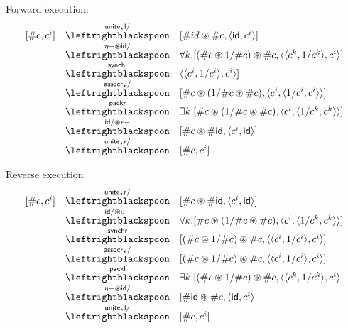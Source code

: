 \documentclass[a4paper,USenglish]{lipics-v2016-utf8x}
\newcommand{\hash}{\#}
\newcommand{\order}[1]{\hash #1}
\newcommand{\iorder}[1]{1/\hash #1}
\newcommand{\synchl}{\mathsf{{synchl}}}
\newcommand{\synchr}{\mathsf{{synchr}}}
\newcommand{\packl}{\mathsf{{packl}}}
\newcommand{\packr}{\mathsf{{packr}}}
\newcommand{\unitetl}{\mathsf{{unite_{\star}l}}}
\newcommand{\unitetr}{\mathsf{{unite_{\star}r}}}
\newcommand{\assocrt}{\mathsf{{assocr_{\star}}}}
\newcommand{\idiso}{\mathsf{{id}}}
\begin{document}
Forward execution:
\[\begin{array}{rcl}
[\order{c},c^i]
&\stackrel{\unitetl/}{\leftrightblackspoon}&
  [\order{id}\circledast\order{c}, \langle \idiso,c^i \rangle] \\
&\stackrel{\eta+\circledast\idiso/}{\leftrightblackspoon}&
  \forall{k}.[(\order{c}\circledast\iorder{c})\circledast\order{c},
  \langle \langle c^k,1/c^k \rangle,c^i \rangle] \\
&\stackrel{\synchl}{\leftrightblackspoon}&
  \langle \langle c^i,1/c^i \rangle,c^i \rangle] \\
&\stackrel{\assocrt/}{\leftrightblackspoon}&
  [\order{c}\circledast(\iorder{c}\circledast\order{c}),
  \langle c^i, \langle 1/c^i,c^i \rangle\rangle] \\
&\stackrel{\packr}{\leftrightblackspoon}&
  \exists{k}.[\order{c}\circledast(\iorder{c}\circledast\order{c}),
  \langle c^i, \langle 1/c^k,c^k \rangle\rangle] \\
&\stackrel{\idiso/\circledast\epsilon-}{\leftrightblackspoon}&
  [\order{c}\circledast\order{\idiso},
  \langle c^i, \idiso \rangle] \\
&\stackrel{\unitetr/}{\leftrightblackspoon}&
  [\order{c}, c^i]
\end{array}\]

Reverse execution:
\[\begin{array}{rcl}
  [\order{c}, c^i]
&\stackrel{\unitetr/}{\leftrightblackspoon}&
  [\order{c}\circledast\order{\idiso},
  \langle c^i, \idiso \rangle] \\
&\stackrel{\idiso/\circledast\epsilon-}{\leftrightblackspoon}&
  \forall{k}.[\order{c}\circledast(\iorder{c}\circledast\order{c}),
  \langle c^i, \langle 1/c^k,c^k \rangle\rangle] \\
&\stackrel{\synchr}{\leftrightblackspoon}&
 [(\order{c}\circledast\iorder{c})\circledast\order{c},
  \langle \langle c^i,1/c^i \rangle,c^i \rangle] \\
&\stackrel{\assocrt/}{\leftrightblackspoon}&
  [(\order{c}\circledast\iorder{c})\circledast\order{c},
  \langle \langle c^i,1/c^i \rangle,c^i \rangle] \\
&\stackrel{\packl}{\leftrightblackspoon}&
  \exists{k}.[(\order{c}\circledast\iorder{c})\circledast\order{c},
  \langle \langle c^k,1/c^k \rangle,c^i \rangle] \\
&\stackrel{\eta+\circledast\idiso/}{\leftrightblackspoon}&
  [\order{\idiso}\circledast\order{c}, \langle \idiso,c^i\rangle] \\
&\stackrel{\unitetl/}{\leftrightblackspoon}&
  [\order{c},c^i]
\end{array}\]
\end{document}

